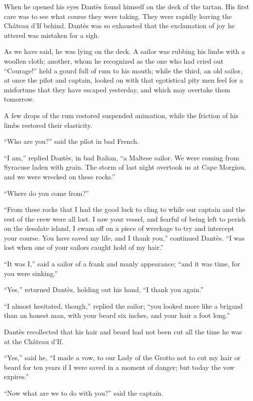 When he opened his eyes Dantès found himself on the deck of the tartan.
His first care was to see what course they were taking. They were
rapidly leaving the Château d’If behind. Dantès was so exhausted that
the exclamation of joy he uttered was mistaken for a sigh.

As we have said, he was lying on the deck. A sailor was rubbing his
limbs with a woollen cloth; another, whom he recognized as the one who
had cried out “Courage!” held a gourd full of rum to his mouth; while
the third, an old sailor, at once the pilot and captain, looked on with
that egotistical pity men feel for a misfortune that they have escaped
yesterday, and which may overtake them tomorrow.

A few drops of the rum restored suspended animation, while the friction
of his limbs restored their elasticity.

“Who are you?” said the pilot in bad French.

“I am,” replied Dantès, in bad Italian, “a Maltese sailor. We were
coming from Syracuse laden with grain. The storm of last night overtook
us at Cape Morgiou, and we were wrecked on these rocks.”

“Where do you come from?”

“From these rocks that I had the good luck to cling to while our
captain and the rest of the crew were all lost. I saw your vessel, and
fearful of being left to perish on the desolate island, I swam off on a
piece of wreckage to try and intercept your course. You have saved my
life, and I thank you,” continued Dantès. “I was lost when one of your
sailors caught hold of my hair.”

“It was I,” said a sailor of a frank and manly appearance; “and it was
time, for you were sinking.”

“Yes,” returned Dantès, holding out his hand, “I thank you again.”

“I almost hesitated, though,” replied the sailor; “you looked more like
a brigand than an honest man, with your beard six inches, and your hair
a foot long.”

Dantès recollected that his hair and beard had not been cut all the
time he was at the Château d’If.

“Yes,” said he, “I made a vow, to our Lady of the Grotto not to cut my
hair or beard for ten years if I were saved in a moment of danger; but
today the vow expires.”

“Now what are we to do with you?” said the captain.

